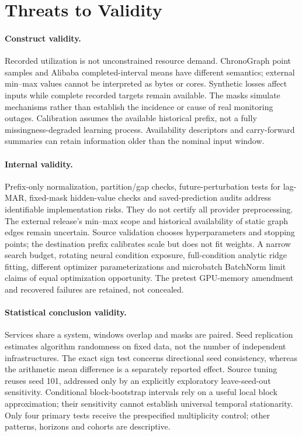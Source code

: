 \section{Threats to Validity}
\paragraph{Construct validity.} Recorded utilization is not unconstrained resource demand. ChronoGraph point samples and Alibaba completed-interval means have different semantics; external min--max values cannot be interpreted as bytes or cores. Synthetic losses affect inputs while complete recorded targets remain available. The masks simulate mechanisms rather than establish the incidence or cause of real monitoring outages. Calibration assumes the available historical prefix, not a fully missingness-degraded learning process. Availability descriptors and carry-forward summaries can retain information older than the nominal input window.

\paragraph{Internal validity.} Prefix-only normalization, partition/gap checks, future-perturbation tests for lag-MAR, fixed-mask hidden-value checks and saved-prediction audits address identifiable implementation risks. They do not certify all provider preprocessing. The external release's min--max scope and historical availability of static graph edges remain uncertain. Source validation chooses hyperparameters and stopping points; the destination prefix calibrates scale but does not fit weights. A narrow search budget, rotating neural condition exposure, full-condition analytic ridge fitting, different optimizer parameterizations and microbatch BatchNorm limit claims of equal optimization opportunity. The pretest GPU-memory amendment and recovered failures are retained, not concealed.

\paragraph{Statistical conclusion validity.} Services share a system, windows overlap and masks are paired. Seed replication estimates algorithm randomness on fixed data, not the number of independent infrastructures. The exact sign test concerns directional seed consistency, whereas the arithmetic mean difference is a separately reported effect. Source tuning reuses seed 101, addressed only by an explicitly exploratory leave-seed-out sensitivity. Conditional block-bootstrap intervals rely on a useful local block approximation; their sensitivity cannot establish universal temporal stationarity. Only four primary tests receive the prespecified multiplicity control; other patterns, horizons and cohorts are descriptive.

